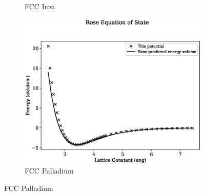 \begin{figure}[htb]
\begin{subfigure}{.32\textwidth}
  \caption{FCC Iron}
  \label{fig:sub-first}
\end{subfigure}
\begin{subfigure}{.32\textwidth}
  \centering
  \includegraphics[width=.94\linewidth]{chapters/potentials_fe_pd_ru/fepd_potential/rose_plot_bp_1.eps}  
  \caption{FCC Palladium}
  \label{fig:sub-first}
\end{subfigure}

\label{fig:binaryalloyconfigurationsbulk}
\end{figure}


























































